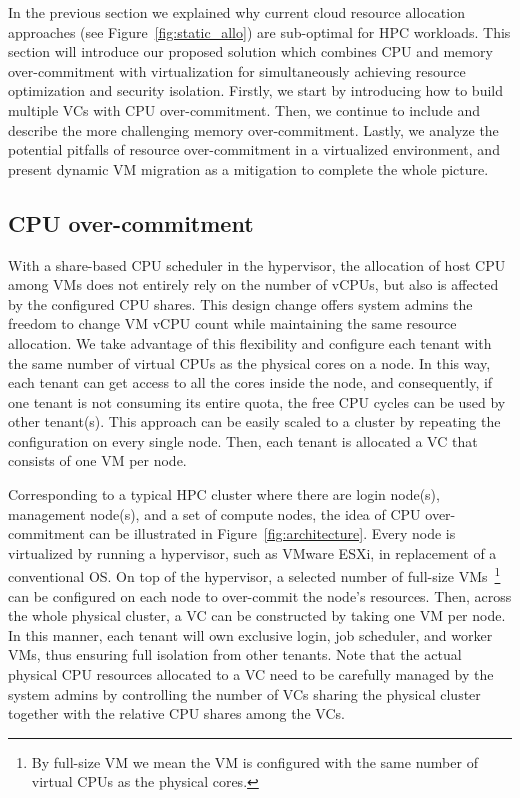In the previous section we explained why current cloud resource allocation approaches 
(see Figure~\ref{fig:static_allo}) 
are sub-optimal for HPC workloads. This section will introduce our proposed solution which combines 
CPU and memory over-commitment with virtualization for simultaneously achieving resource optimization and security isolation. Firstly, we start by introducing how to build multiple VCs with CPU over-commitment. Then, we continue to include and describe the more challenging memory over-commitment. Lastly, we analyze the 
potential pitfalls of resource over-commitment in a virtualized environment, 
and present dynamic VM migration as a mitigation to complete the whole picture.

\subsection{CPU over-commitment}
With a share-based CPU scheduler in the hypervisor, the allocation of host CPU among VMs does not entirely rely on the number of vCPUs, but also is affected by the configured CPU shares. 
This design change offers system admins the freedom to 
change VM vCPU count while maintaining the same resource allocation. We take advantage of this 
flexibility and configure each tenant with the same number of virtual CPUs as the physical cores 
on a node. In this way, each tenant can get access to all the cores inside the node, and consequently, if one tenant 
is not consuming its entire quota, the free CPU cycles can be used by other tenant(s). 
This approach can be easily scaled to a cluster by repeating the configuration on every 
single node. Then, each tenant is allocated a VC that consists of one VM per node. 

Corresponding to a typical HPC cluster where there are login node(s), management node(s), 
and a set of compute nodes, the idea of CPU over-commitment can be illustrated in 
Figure~\ref{fig:architecture}. Every node is virtualized by running a hypervisor, 
such as VMware ESXi, in replacement of a conventional OS. On top of the hypervisor, 
a selected number of full-size VMs~\footnote{By full-size VM we mean the VM is configured with the same number of virtual CPUs as the physical cores.} 
can be configured on each node to over-commit the 
node's resources. Then, across the whole physical cluster, a VC
can be constructed by taking one VM per node. %
In this manner, each tenant will own exclusive login, job scheduler, and worker VMs, thus ensuring full isolation from other tenants. 
Note that the actual physical 
CPU resources allocated to a VC need to be 
carefully managed by the system admins by controlling the number of VCs sharing the physical cluster 
together with the relative CPU shares among the VCs.  


